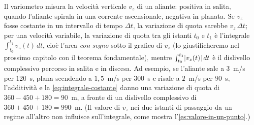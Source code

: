 \begin{idea}
Il variometro misura la velocità verticale $v_{z}$ di un aliante: positiva in salita,
quando l'aliante spirala in una corrente ascensionale, negativa in planata. Se
$v_{z}$ fosse costante in un intervallo di tempo $\Delta t$, la variazione di quota
sarebbe $v_{z}\,\Delta t$; per una velocità variabile, la variazione di quota tra gli
istanti $t_{0}$ e $t_{1}$ è l'integrale $\int_{t_{0}}^{t_{1}}v_{z}(t)\,dt$, cioè l'area
\emph{con segno} sotto il grafico di $v_{z}$ (lo giustificheremo nel prossimo capitolo con
il teorema fondamentale), mentre $\int_{t_{0}}^{t_{1}}\lvert v_{z}(t)\rvert\,dt$ è il dislivello
complessivo percorso in salita e in discesa. Ad esempio, se l'aliante sale a
$3$~m/s per $120$~s, plana scendendo a $1{,}5$~m/s per $300$~s e risale a $2$~m/s per
$90$~s, l'additività e la \eqref{eq:integrale-costante} danno una variazione di quota di
$360-450+180=90$~m, a fronte di un dislivello complessivo di $360+450+180=990$~m. (Il
valore di $v_{z}$ nei due istanti di passaggio da un regime all'altro non influisce
sull'integrale, come mostra l'\cref{es:valore-in-un-punto}.)
\end{idea}
